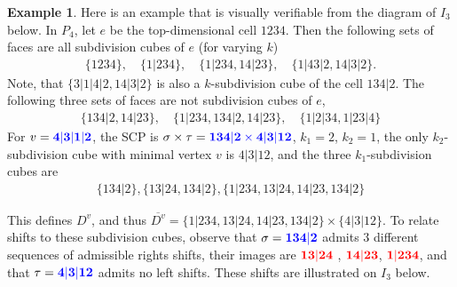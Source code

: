 \documentclass{amsart}
\newcommand{\red}{\color{red}} %
\newcommand{\blue}{\color{blue}} %
\theoremstyle{definition}
\newtheorem{example}[theorem]{Example}
\newcommand{\subdivpairsv}{D^v}
\newcommand{\maxsubdivpairsv}{\overline{D^v}}
\begin{document}
\begin{example}\label{ex:subdivision cubes}
Here is an example that is visually verifiable from the diagram of $I_3$ below.
In $P_4$, let $e$ be the top-dimensional cell $1234$. Then the following sets of faces are all subdivision cubes of $e$ (for varying $k$)
\begin{align*}
    \{1234\},\quad \{1|234\},\quad \{1|234, 14|23\},\quad \{1|43|2,14|3|2\}.
\end{align*}
Note, that $\{3|1|4|2,14|3|2\}$ is also a $k$-subdivision cube of the cell $134|2$.
The following three sets of faces are not subdivision cubes of $e$,
\begin{align*}
    \{134|2, 14|23\},\quad \{1|234, 134|2, 14|23\}, \quad \{1|2|34,1|23|4\}
\end{align*}
For $v = \blue{\mathbf{4|3|1|2}}$, the SCP is $\sigma\times \tau = \blue{\mathbf{134|2\times 4|3|12}}$, $k_1=2$, $k_2=1$, the only $k_2$-subdivision cube with minimal vertex $v$ is $4|3|12$, and the three $k_1$-subdivision cubes are
\begin{align*}
    \{134|2\}, \{13|24, 134|2\}, \{ 1|234, 13|24, 14|23, 134|2\}
\end{align*}

This defines $\subdivpairsv$, and thus $\maxsubdivpairsv=\{ 1|234, 13|24, 14|23, 134|2\} \times \{4|3|12\}$.
To relate shifts to these subdivision cubes, observe that $\sigma = \blue{\mathbf{134|2}}$ admits $3$ different sequences of admissible rights shifts, their images are $\red{\mathbf{13|24}}$ , $\red{\mathbf{14|23}}$, $\red{\mathbf{1|234}}$,
and that $\tau = \blue{\mathbf{4|3|12}}$ admits no left shifts.
These shifts are illustrated on $I_3$ below.


\end{example}
\end{document}
